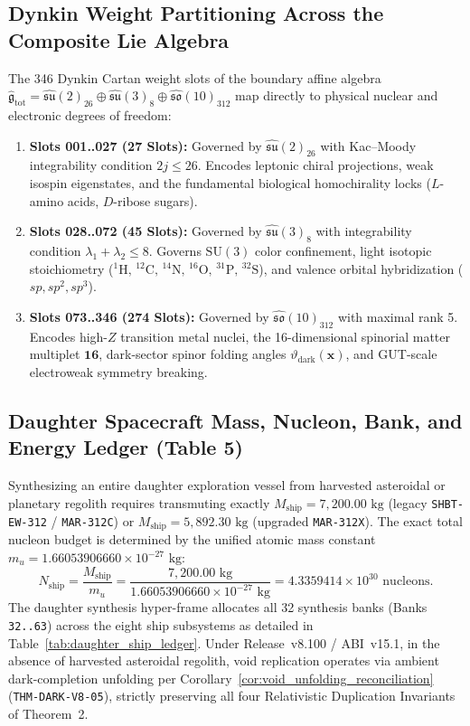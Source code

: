 \documentclass[11pt,onecolumn]{article}
\begin{document}
\subsection{Dynkin Weight Partitioning Across the Composite Lie Algebra}
The 346 Dynkin Cartan weight slots of the boundary affine algebra $\hat{\mathfrak{g}}_{\text{tot}} = \hat{\mathfrak{su}}(2)_{26} \oplus \hat{\mathfrak{su}}(3)_8 \oplus \hat{\mathfrak{so}}(10)_{312}$ map directly to physical nuclear and electronic degrees of freedom:
\begin{enumerate}
    \item \textbf{Slots 001..027 (27 Slots):} Governed by $\hat{\mathfrak{su}}(2)_{26}$ with Kac--Moody integrability condition $2j \le 26$. Encodes leptonic chiral projections, weak isospin eigenstates, and the fundamental biological homochirality locks ($L$-amino acids, $D$-ribose sugars).
    \item \textbf{Slots 028..072 (45 Slots):} Governed by $\hat{\mathfrak{su}}(3)_8$ with integrability condition $\lambda_1 + \lambda_2 \le 8$. Governs $\text{SU}(3)$ color confinement, light isotopic stoichiometry ($^{1}\text{H}, \,^{12}\text{C}, \,^{14}\text{N}, \,^{16}\text{O}, \,^{31}\text{P}, \,^{32}\text{S}$), and valence orbital hybridization ($sp, sp^2, sp^3$).
    \item \textbf{Slots 073..346 (274 Slots):} Governed by $\hat{\mathfrak{so}}(10)_{312}$ with maximal rank 5. Encodes high-$Z$ transition metal nuclei, the 16-dimensional spinorial matter multiplet $\mathbf{16}$, dark-sector spinor folding angles $\vartheta_{\text{dark}}(\mathbf{x})$, and GUT-scale electroweak symmetry breaking.
\end{enumerate}

\FloatBarrier
\subsection{Daughter Spacecraft Mass, Nucleon, Bank, and Energy Ledger (Table 5)}
Synthesizing an entire daughter exploration vessel from harvested asteroidal or planetary regolith requires transmuting exactly $M_{\text{ship}} = 7{,}200.00\text{ kg}$ (legacy \texttt{SHBT-EW-312} / \texttt{MAR-312C}) or $M_{\text{ship}} = 5{,}892.30\text{ kg}$ (upgraded \texttt{MAR-312X}). The exact total nucleon budget is determined by the unified atomic mass constant $m_u = 1.66053906660 \times 10^{-27}\text{ kg}$:
\begin{equation}
N_{\text{ship}} = \frac{M_{\text{ship}}}{m_u} = \frac{7{,}200.00\text{ kg}}{1.66053906660 \times 10^{-27}\text{ kg}} = 4.3359414 \times 10^{30}\text{ nucleons}.
\label{eq:daughter_ship_nucleons}
\end{equation}
The daughter synthesis hyper-frame allocates all 32 synthesis banks (Banks \texttt{32..63}) across the eight ship subsystems as detailed in Table~\ref{tab:daughter_ship_ledger}. Under Release~v8.100 / ABI~v15.1, in the absence of harvested asteroidal regolith, void replication operates via ambient dark-completion unfolding per Corollary~\ref{cor:void_unfolding_reconciliation} (\texttt{THM-DARK-V8-05}), strictly preserving all four Relativistic Duplication Invariants of Theorem~2.
\end{document}
